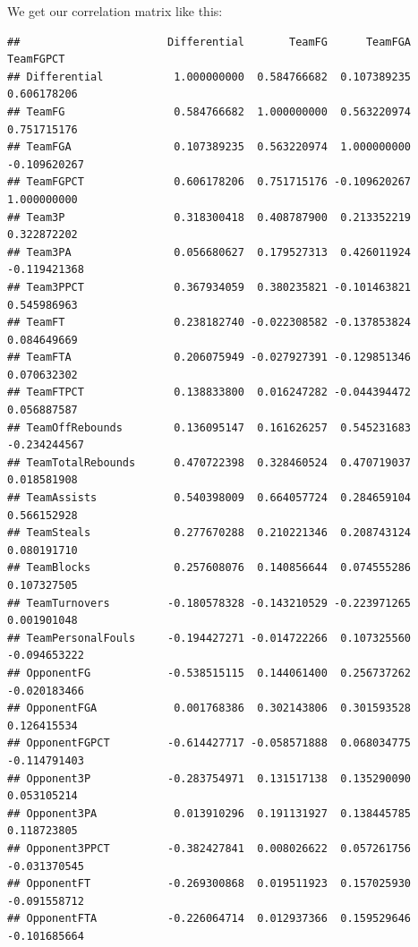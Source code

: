 \documentclass[
]{book}
\newenvironment{Shaded}{\begin{snugshade}}{\end{snugshade}}
\newcommand{\FunctionTok}[1]{\textcolor[rgb]{0.00,0.00,0.00}{#1}}
\newcommand{\NormalTok}[1]{#1}
\newcommand{\OtherTok}[1]{\textcolor[rgb]{0.56,0.35,0.01}{#1}}
\newcommand{\SpecialCharTok}[1]{\textcolor[rgb]{0.00,0.00,0.00}{#1}}
\begin{document}
We get our correlation matrix like this:

\begin{Shaded}
\end{Shaded}

\begin{verbatim}
##                       Differential       TeamFG      TeamFGA    TeamFGPCT
## Differential           1.000000000  0.584766682  0.107389235  0.606178206
## TeamFG                 0.584766682  1.000000000  0.563220974  0.751715176
## TeamFGA                0.107389235  0.563220974  1.000000000 -0.109620267
## TeamFGPCT              0.606178206  0.751715176 -0.109620267  1.000000000
## Team3P                 0.318300418  0.408787900  0.213352219  0.322872202
## Team3PA                0.056680627  0.179527313  0.426011924 -0.119421368
## Team3PPCT              0.367934059  0.380235821 -0.101463821  0.545986963
## TeamFT                 0.238182740 -0.022308582 -0.137853824  0.084649669
## TeamFTA                0.206075949 -0.027927391 -0.129851346  0.070632302
## TeamFTPCT              0.138833800  0.016247282 -0.044394472  0.056887587
## TeamOffRebounds        0.136095147  0.161626257  0.545231683 -0.234244567
## TeamTotalRebounds      0.470722398  0.328460524  0.470719037  0.018581908
## TeamAssists            0.540398009  0.664057724  0.284659104  0.566152928
## TeamSteals             0.277670288  0.210221346  0.208743124  0.080191710
## TeamBlocks             0.257608076  0.140856644  0.074555286  0.107327505
## TeamTurnovers         -0.180578328 -0.143210529 -0.223971265  0.001901048
## TeamPersonalFouls     -0.194427271 -0.014722266  0.107325560 -0.094653222
## OpponentFG            -0.538515115  0.144061400  0.256737262 -0.020183466
## OpponentFGA            0.001768386  0.302143806  0.301593528  0.126415534
## OpponentFGPCT         -0.614427717 -0.058571888  0.068034775 -0.114791403
## Opponent3P            -0.283754971  0.131517138  0.135290090  0.053105214
## Opponent3PA            0.013910296  0.191131927  0.138445785  0.118723805
## Opponent3PPCT         -0.382427841  0.008026622  0.057261756 -0.031370545
## OpponentFT            -0.269300868  0.019511923  0.157025930 -0.091558712
## OpponentFTA           -0.226064714  0.012937366  0.159529646 -0.101685664

\end{verbatim}
\end{document}
